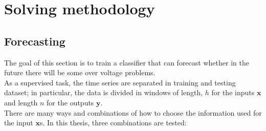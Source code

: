 \section{Solving methodology}
\subsection{Forecasting}
The goal of this section is to train a classifier that can forecast whether in the future there will be some over voltage problems.\\

As a supervised task, the time series are separated in training and testing dataset; in particular, the data is divided in windows of length, $h$ for the inputs $\textbf{x}$ and length $n$ for the outputs $\textbf{y}$. \\

There are many ways and combinations of how to choose the information used for the input $\textbf{x}$s. In this thesis, three combinations are tested:

